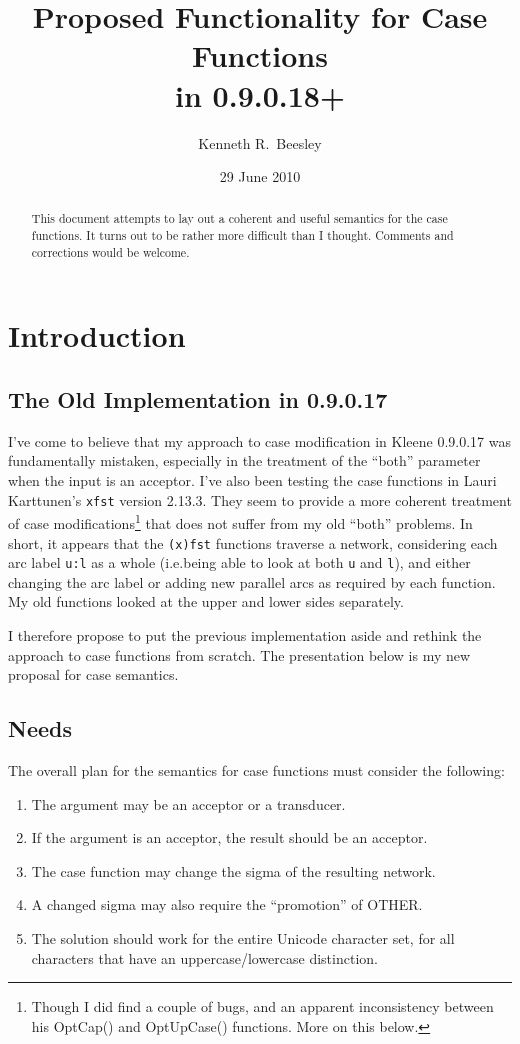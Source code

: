 \documentclass[letterpaper,12pt]{article}
\title{Proposed Functionality for Case Functions\\
in 0.9.0.18+}
\author{Kenneth R.~Beesley}
\date{29 June 2010}
\begin{document}
\maketitle

\begin{abstract}
This document attempts to lay out a coherent and useful semantics for the case
functions.  It turns out to be rather more difficult than I thought.  Comments and corrections would be welcome.
\end{abstract}

\section{Introduction}

\subsection{The Old Implementation in 0.9.0.17}

I've come to believe that my approach to case modification in Kleene 0.9.0.17 was
fundamentally mistaken, especially in the treatment of the ``both''
parameter when the input is an acceptor.  
I've also been testing the case functions in Lauri Karttunen's \texttt{xfst}
version 2.13.3. They seem to
provide a more coherent treatment of case modifications\footnote{Though I did find a couple
of bugs, and an apparent inconsistency between his OptCap() and
OptUpCase() functions.  More on this below.}
that does not suffer from my old ``both'' problems.  In short, it appears
that the \texttt{(x)fst} functions traverse a network, considering each arc label
\texttt{u:l} as a whole (i.e.\@ being able to look at both \texttt{u} and \texttt{l}), and
either changing the arc label or adding new parallel arcs as required by each function.
My old functions looked at the upper and lower sides separately.

I therefore propose to put the previous implementation
aside and rethink the approach to case functions from scratch.  The presentation below is my new proposal for case
semantics.

\subsection{Needs}

The overall plan for the semantics for case functions must consider the following:

\begin{enumerate}
\item
The argument may be an acceptor or a transducer.
\item
If the argument is an acceptor, the result should be an acceptor.
\item
The case function may change the sigma of the resulting network.
\item
A changed sigma may also require the ``promotion'' of OTHER.
\item
The solution should work for the entire Unicode character set, for all characters that
have an uppercase/lowercase distinction.
\end{enumerate}
\end{document}
